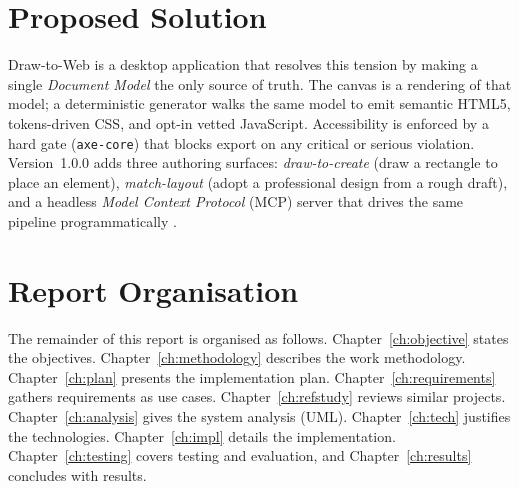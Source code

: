 \section{Proposed Solution}
Draw-to-Web is a desktop application that resolves this tension by making a single
\emph{Document Model} the only source of truth. The canvas is a rendering of that
model; a deterministic generator walks the same model to emit semantic HTML5,
tokens-driven CSS, and opt-in vetted JavaScript. Accessibility is enforced by a
hard gate (\texttt{axe-core}) that blocks export on any critical or serious
violation. Version~1.0.0 adds three authoring surfaces: \emph{draw-to-create}
(draw a rectangle to place an element), \emph{match-layout} (adopt a professional
design from a rough draft), and a headless \emph{Model Context Protocol} (MCP)
server that drives the same pipeline programmatically \cite{mcp-spec}.

\section{Report Organisation}
The remainder of this report is organised as follows. Chapter~\ref{ch:objective}
states the objectives. Chapter~\ref{ch:methodology} describes the work
methodology. Chapter~\ref{ch:plan} presents the implementation plan.
Chapter~\ref{ch:requirements} gathers requirements as use cases.
Chapter~\ref{ch:refstudy} reviews similar projects. Chapter~\ref{ch:analysis}
gives the system analysis (UML). Chapter~\ref{ch:tech} justifies the technologies.
Chapter~\ref{ch:impl} details the implementation. Chapter~\ref{ch:testing} covers
testing and evaluation, and Chapter~\ref{ch:results} concludes with results.
